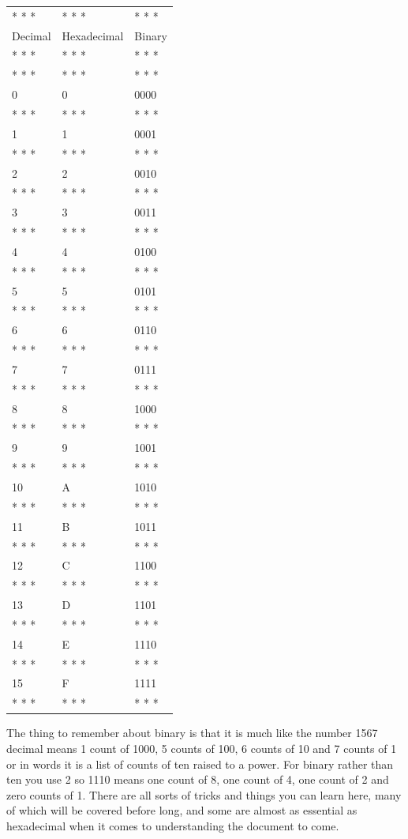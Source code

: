 \documentclass[
]{book}
\begin{document}
\begin{longtable}[]{@{}lll@{}}
\toprule()
\endhead
* * * & * * * & * * * \\
Decimal & Hexadecimal & Binary \\
* * * & * * * & * * * \\
* * * & * * * & * * * \\
0 & 0 & 0000 \\
* * * & * * * & * * * \\
1 & 1 & 0001 \\
* * * & * * * & * * * \\
2 & 2 & 0010 \\
* * * & * * * & * * * \\
3 & 3 & 0011 \\
* * * & * * * & * * * \\
4 & 4 & 0100 \\
* * * & * * * & * * * \\
5 & 5 & 0101 \\
* * * & * * * & * * * \\
6 & 6 & 0110 \\
* * * & * * * & * * * \\
7 & 7 & 0111 \\
* * * & * * * & * * * \\
8 & 8 & 1000 \\
* * * & * * * & * * * \\
9 & 9 & 1001 \\
* * * & * * * & * * * \\
10 & A & 1010 \\
* * * & * * * & * * * \\
11 & B & 1011 \\
* * * & * * * & * * * \\
12 & C & 1100 \\
* * * & * * * & * * * \\
13 & D & 1101 \\
* * * & * * * & * * * \\
14 & E & 1110 \\
* * * & * * * & * * * \\
15 & F & 1111 \\
* * * & * * * & * * * \\
\bottomrule()
\end{longtable}

The thing to remember about binary is that it is much like the number 1567 decimal means 1 count of 1000, 5 counts of 100, 6 counts of 10 and 7 counts of 1 or in words it is a list of counts of ten raised to a power. For binary rather than ten you use 2 so 1110 means one count of 8, one count of 4, one count of 2 and zero counts of 1. There are all sorts of tricks and things you can learn here, many of which will be covered before long, and some are almost as essential as hexadecimal when it comes to understanding the document to come.
\end{document}
